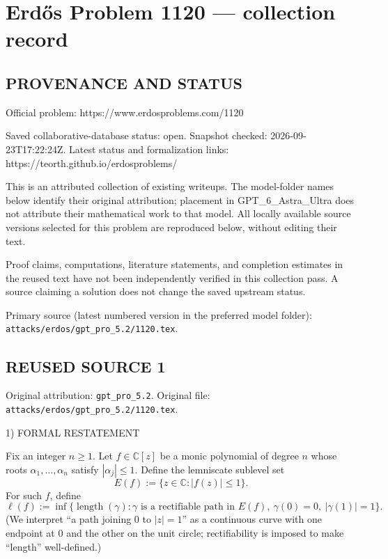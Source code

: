\section*{Erd\H{o}s Problem 1120 --- collection record}

\subsection*{PROVENANCE AND STATUS}
Official problem: https://www.erdosproblems.com/1120

Saved collaborative-database status: open.
Snapshot checked: 2026-09-23T17:22:24Z.
Latest status and formalization links: https://teorth.github.io/erdosproblems/

This is an attributed collection of existing writeups. The model-folder names below identify their original attribution; placement in GPT\_6\_Astra\_Ultra does not attribute their mathematical work to that model. All locally available source versions selected for this problem are reproduced below, without editing their text.

Proof claims, computations, literature statements, and completion estimates in the reused text have not been independently verified in this collection pass. A source claiming a solution does not change the saved upstream status.

Primary source (latest numbered version in the preferred model folder): \texttt{attacks/erdos/gpt\_pro\_5.2/1120.tex}.

\subsection*{REUSED SOURCE 1}
Original attribution: \texttt{gpt\_pro\_5.2}.
Original file: \texttt{attacks/erdos/gpt\_pro\_5.2/1120.tex}.


1) FORMAL RESTATEMENT

Fix an integer \(n\ge 1\). Let \(f\in\mathbb{C}[z]\) be a monic polynomial of degree \(n\) whose roots \(\alpha_1,\dots,\alpha_n\) satisfy \(|\alpha_j|\le 1\).
Define the lemniscate sublevel set
\[
E(f):=\{z\in\mathbb{C}: |f(z)|\le 1\}.
\]
For such \(f\), define
\[
\ell(f):=\inf\{\operatorname{length}(\gamma): \gamma\text{ is a rectifiable path in }E(f),\ \gamma(0)=0,\ |\gamma(1)|=1\}.
\]
(We interpret ``a path joining \(0\) to \(|z|=1\)'' as a continuous curve with one endpoint at \(0\) and the other on the unit circle; rectifiability is imposed to make ``length'' well-defined.)

